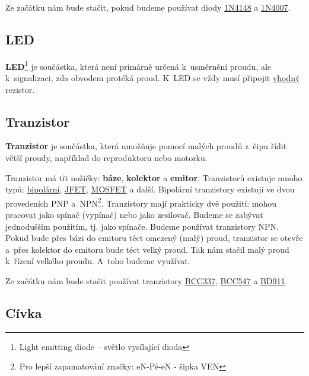 Ze začátku nám bude stačit, pokud budeme používat diody  
 \hyperlink{1N4148}{1N4148} a 
 \hyperlink{1N4007}{1N4007}.
   
\subsection{LED}

\hypertarget{LED}{}  
{\bf LED}\footnote{Light emitting diode -- světlo vysílající dioda}
je součástka, která není primárně určená k~usměrnění proudu, ale k~signalizaci, zda obvodem protéká proud.
K~LED se vždy musí připojit  \hyperref[vypocet_rezistor]{vhodný} rezistor. 

\subsection{Tranzistor} \label{tranzistor}

{\bf Tranzistor} je součástka, která umožňuje pomocí malých proudů z~čipu řídit větší proudy, například do reproduktoru nebo motorku. 

Tranzistor má tři nožičky: {\bf báze}, {\bf kolektor} a {\bf emitor}. 
Tranzistorů existuje mnoho typů: \href{https://maly.gitbooks.io/hradla-volty-jednocipy/7_polovodice/73_tranzistor.html}{bipolární},
\href{https://maly.gitbooks.io/hradla-volty-jednocipy/7_polovodice/75_tranzistor_rizeny_polem_fet.html}{JFET}, 
\href{https://maly.gitbooks.io/hradla-volty-jednocipy/7_polovodice/77_mosfet.html}{MOSFET} a další. 
Bipolární tranzistory existují ve dvou provedeních PNP a~NPN\footnote{Pro lepší zapamatování značky: eN-Pé-eN - šipka VEN}. 
 Tranzistory mají prakticky dvě použití: mohou pracovat jako spínač (vypínač) nebo jako zesilovač.
  Budeme se zabývat jednodušším použitím, tj. jako spínače. 
  Budeme používat tranzistory NPN. 
  Pokud bude přes bázi do emitoru téct omezený (malý) proud, tranzistor se otevře a~přes kolektor do emitoru bude téct velký proud. 
  Tak nám stačil malý proud k~řízení velkého proudu. A~toho budeme využívat. 

Ze začátku nám bude stačit používat tranzistory 
\hyperlink{BCC337}{BCC337}, 
\hyperlink{BCC547}{BCC547} a
\hyperlink{BD911}{BD911}. 


\subsection{Cívka}

